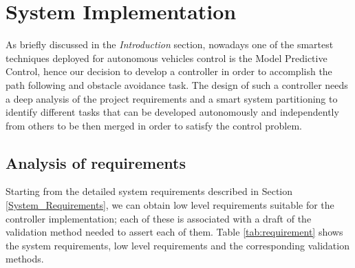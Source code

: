 \section{System Implementation} \label{system_partitioning}
As briefly discussed in the \textit{Introduction} section, nowadays one of the smartest techniques deployed for autonomous vehicles control is the Model Predictive Control, hence our decision to develop a controller in order to accomplish the path following and obstacle avoidance task.
The design of such a controller needs a deep analysis of the project requirements and a smart system partitioning to identify different tasks that can be developed autonomously and independently from others to be then merged in order to satisfy the control problem.


\subsection{Analysis of requirements}
Starting from the detailed system requirements described in Section \ref{System_Requirements}, we can obtain low level requirements suitable for the controller implementation; each of these is associated with a draft of the validation method needed to assert each of them. Table \ref{tab:requirement} shows the system requirements, low level requirements and the corresponding validation methods.

